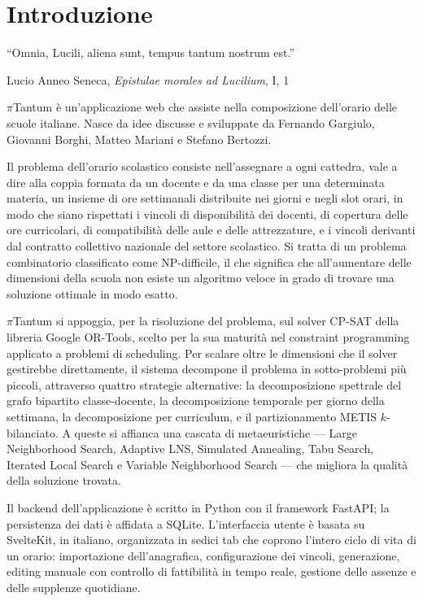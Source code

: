\chapter*{Introduzione}
\label{ch:prologo}

\epigraph{``Omnia, Lucili, aliena sunt, tempus tantum nostrum
est.''}{Lucio Anneo Seneca, \emph{Epistulae morales ad
Lucilium}, I, 1}


$\pi$Tantum \`e un'applicazione web che assiste nella
composizione dell'orario delle scuole italiane. Nasce da idee
discusse e sviluppate da Fernando Gargiulo, Giovanni Borghi,
Matteo Mariani e Stefano Bertozzi.

Il problema dell'orario scolastico consiste nell'assegnare a
ogni cattedra, vale a dire alla coppia formata da un docente
e da una classe per una determinata materia, un insieme di
ore settimanali distribuite nei giorni e negli slot orari, in
modo che siano rispettati i vincoli di disponibilit\`a dei
docenti, di copertura delle ore curricolari, di compatibilit\`a
delle aule e delle attrezzature, e i vincoli derivanti dal
contratto collettivo nazionale del settore scolastico. Si
tratta di un problema combinatorio classificato come
NP-difficile, il che significa che all'aumentare delle
dimensioni della scuola non esiste un algoritmo veloce in
grado di trovare una soluzione ottimale in modo esatto.

$\pi$Tantum si appoggia, per la risoluzione del problema, sul
solver CP-SAT della libreria Google OR-Tools, scelto per la
sua maturit\`a nel constraint programming applicato a
problemi di scheduling. Per scalare oltre le dimensioni che
il solver gestirebbe direttamente, il sistema decompone il
problema in sotto-problemi pi\`u piccoli, attraverso quattro
strategie alternative: la decomposizione spettrale del grafo
bipartito classe-docente, la decomposizione temporale per
giorno della settimana, la decomposizione per curriculum, e
il partizionamento METIS $k$-bilanciato. A queste si affianca
una cascata di metaeuristiche --- Large Neighborhood Search,
Adaptive LNS, Simulated Annealing, Tabu Search, Iterated
Local Search e Variable Neighborhood Search --- che migliora
la qualit\`a della soluzione trovata.

Il backend dell'applicazione \`e scritto in Python con il
framework FastAPI; la persistenza dei dati \`e affidata a
SQLite. L'interfaccia utente \`e basata su SvelteKit, in
italiano, organizzata in sedici tab che coprono l'intero
ciclo di vita di un orario: importazione dell'anagrafica,
configurazione dei vincoli, generazione, editing manuale con
controllo di fattibilit\`a in tempo reale, gestione delle
assenze e delle supplenze quotidiane.

